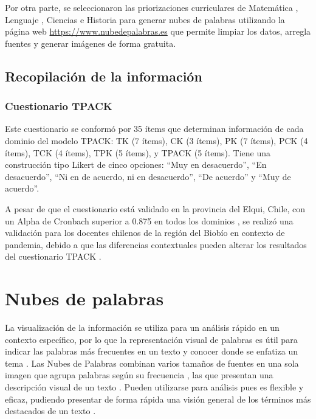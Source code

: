 \documentclass[spanish]{textolivre}
\begin{document}
Por otra parte, se seleccionaron las priorizaciones curriculares de Matemática \cite{unidad_de_curriculum_y_evaluacion_uce_priorizacion_2020b}, Lenguaje \cite{unidad_de_curriculum_y_evaluacion_uce_priorizacion_2020c}, Ciencias \cite{unidad_de_curriculum_y_evaluacion_uce_priorizacion_2020d} e Historia \cite{unidad_de_curriculum_y_evaluacion_uce_priorizacion_2020e} para generar nubes de palabras utilizando la página web \url{https://www.nubedepalabras.es} que permite limpiar los datos, arregla fuentes y generar imágenes de forma gratuita.

\subsection{Recopilación de la información}\label{sec-organizacao-latex}
\subsubsection{Cuestionario TPACK}
Este cuestionario se conformó por 35 ítems que determinan información de cada dominio del modelo TPACK: TK (7 ítems), CK (3 ítems), PK (7 ítems), PCK (4 ítems), TCK (4 ítems), TPK (5 ítems), y TPACK (5 ítems). Tiene una construcción tipo Likert de cinco opciones: “Muy en desacuerdo”, “En desacuerdo”, “Ni en de acuerdo, ni en desacuerdo”, “De acuerdo” y “Muy de acuerdo”. 

A pesar de que el cuestionario está validado en la provincia del Elqui, Chile, con un Alpha de Cronbach superior a 0.875 en todos los dominios \cite{tapia_silva_conocimiento_2019}, se realizó una validación para los docentes chilenos de la región del Biobío en contexto de pandemia, debido a que las diferencias contextuales pueden alterar los resultados del cuestionario TPACK \cite[p. 1618]{khine_exploring_2017}.

\section{Nubes de palabras}\label{sec-titulo}
La visualización de la información se utiliza para un análisis rápido en un contexto específico, por lo que la representación visual de palabras es útil para indicar las palabras más frecuentes en un texto y conocer donde se enfatiza un tema \cite[p. 78]{de_lucia_castillo_nubes_2016}. Las Nubes de Palabras combinan varios tamaños de fuentes en una sola imagen que agrupa palabras según su frecuencia \cite[p. 49]{viegas_timelinestag_2008}, las que presentan una descripción visual de un texto \cite[p. 634]{mcnaught_using_2010}. Pueden utilizarse para análisis pues es flexible y eficaz, pudiendo presentar de forma rápida una visión general de los términos más destacados de un texto \cite[p. 82]{de_lucia_castillo_nubes_2016}. 
\end{document}
